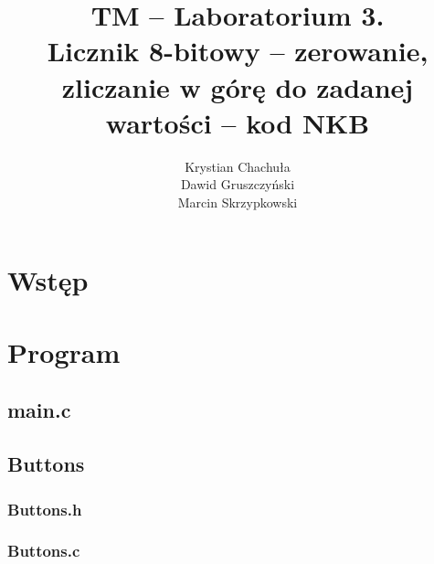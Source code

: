 \documentclass[fleqn]{article}
\title{TM -- Laboratorium 3. \\ \large Licznik 8-bitowy – zerowanie, zliczanie w górę do zadanej wartości – kod NKB}
\author{Krystian Chachuła \\ Dawid Gruszczyński \\ Marcin Skrzypkowski}
\begin{document}
\maketitle

\setcounter{page}{0}
\thispagestyle{empty}

\pagebreak

\setcounter{page}{1}

\section{Wstęp}

\pagebreak

\section{Program}
\subsection{main.c}

\noindent\begin{minipage}[t]{.45\textwidth}
	
\end{minipage}\hfill
\noindent\begin{minipage}[t]{.45\textwidth}
	
\end{minipage}\hfill

\pagebreak

\noindent\begin{minipage}[t]{.45\textwidth}
	
\end{minipage}\hfill
\noindent\begin{minipage}[t]{.45\textwidth}
	
	\subsection{Buttons}
	\subsubsection{Buttons.h}
	
	\subsubsection{Buttons.c}
	
\end{minipage}\hfill
\end{document}
